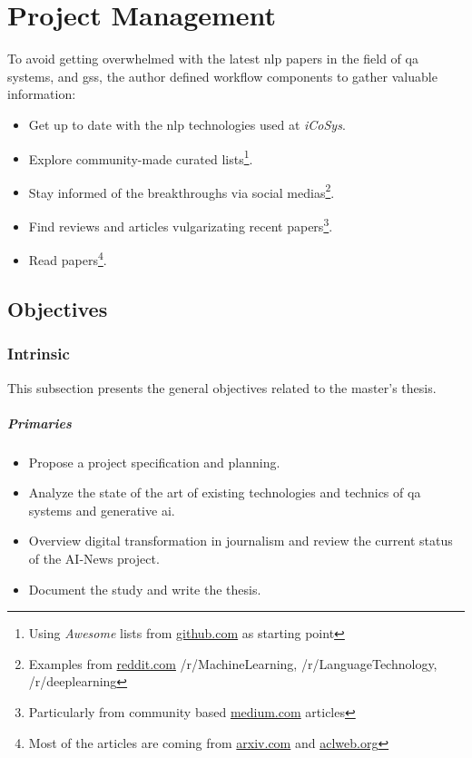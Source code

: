 \chapter{Project Management}
\label{chap:final-project-management}


To avoid getting overwhelmed with the latest \gls{nlp} papers in the field of \gls{qa} systems, and \glspl{gs}, the author defined workflow components to gather valuable information:

\begin{itemize}
    \setlength\itemsep{0em}
    \item Get up to date with the \gls{nlp} technologies used at \textit{iCoSys}.
    \item Explore community-made curated lists\footnote{Using \textit{Awesome} lists from \url{github.com} as starting point}.
    \item Stay informed of the breakthroughs via social medias\footnote{Examples from \url{reddit.com} /r/MachineLearning, /r/LanguageTechnology, /r/deeplearning}.
    \item Find reviews and articles vulgarizating recent papers\footnote{Particularly from community based \url{medium.com} articles}.
    \item Read papers\footnote{Most of the articles are coming from \url{arxiv.com} and \url{aclweb.org}}.
\end{itemize}

\section{Objectives}
\subsection{Intrinsic}
This subsection presents the general objectives related to the master's thesis.
\paragraph{Primaries}
\begin{itemize}[noitemsep]
    \item Propose a project specification and planning.
    \item Analyze the state of the art of existing technologies and technics of \gls{qa} systems and \gls{generative} \gls{ai}.
    \item Overview digital transformation in journalism and review the current status of the AI-News project.
    \item Document the study and write the thesis.
\end{itemize}

